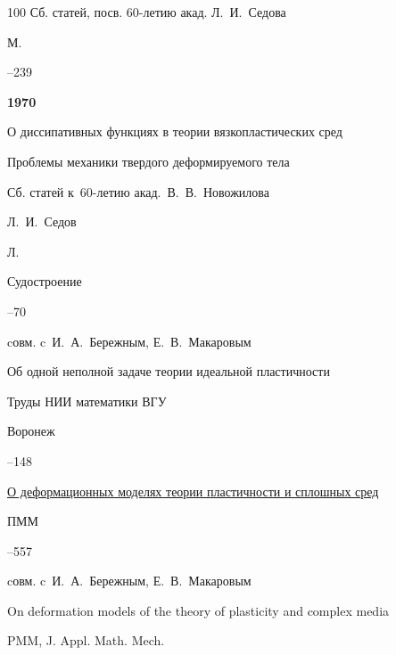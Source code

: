 \begin{thebibliography}{100}
\bookinfo Сб. статей, посв. 60-летию акад. Л.~И.~Седова

\publaddr М.


–239



\item[] \centerline{\bf 1970}




\paper О диссипативных функциях в теории вязкопластических сред 

\inbook   Проблемы механики твердого деформируемого тела 

\bookinfo Сб. статей к~60-летию акад.~В.~В.~Новожилова 

\ed Л.~И.~Седов

\publaddr Л.

\publ Судостроение


–70

\miscnote cовм. c~И.~А.~Бережным, Е.~В.~Макаровым




\paper Об одной неполной задаче теории идеальной пластичности 

\inbook Труды НИИ математики ВГУ

\publaddr Воронеж 


–148






\paper \href{https://zbmath.org/?q=an:0269.73036}{О деформационных моделях теории пластичности и сплошных сред}

\jour ПММ




–557 

\miscnote cовм. c~И.~А.~Бережным, Е.~В.~Макаровым


\transl


\paper On deformation models of the theory of plasticity and complex media

\jour PMM, J. Appl. Math. Mech. 


\end{thebibliography}

